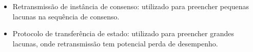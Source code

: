 \begin{itemize}
  \item Retransmissão de instância de consenso: utilizado para preencher pequenas lacunas
    na sequência de consenso.
  \item Protocolo de transferência de estado: utilizado para preencher grandes lacunas,
    onde retransmissão tem potencial perda de desempenho.
\end{itemize}

